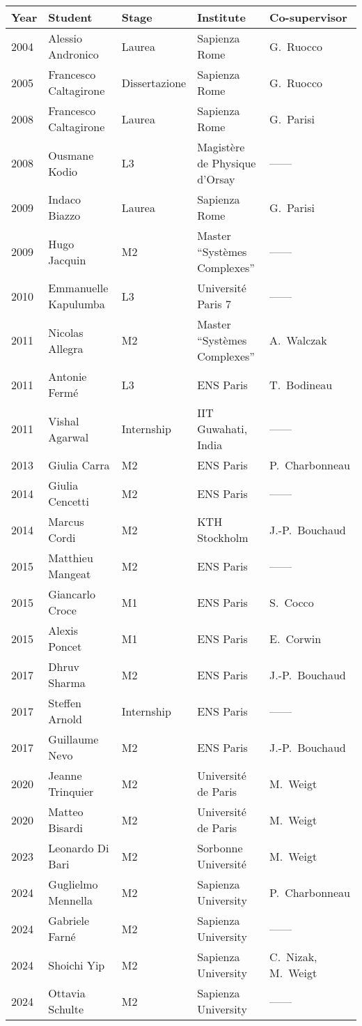 \documentclass[a4paper,10pt]{article}
\begin{document}
\begin{table}[h]
\begin{tabular}{lllll}
Year  & Student   & Stage   & Institute & Co-supervisor \\
\hline
2004 & Alessio Andronico & Laurea  & Sapienza Rome & G.~Ruocco \\
2005 & Francesco Caltagirone & Dissertazione  & Sapienza Rome&  G.~Ruocco \\
2008 & Francesco Caltagirone & Laurea  & Sapienza Rome&  G.~Parisi \\
2008 & Ousmane Kodio  & L3   & Magist\`ere de Physique d'Orsay  & ------ \\
2009 & Indaco Biazzo     & Laurea  & Sapienza Rome  & G.~Parisi \\
2009 & Hugo Jacquin   & M2   & Master ``Syst\`emes Complexes'' & ------ \\
2010 & Emmanuelle Kapulumba & L3  & Universit\'e Paris 7  & ------ \\
2011 & Nicolas Allegra   & M2 & Master ``Syst\`emes Complexes'' & A.~Walczak \\
2011 & Antonie Ferm\'e  & L3 & ENS Paris & T.~Bodineau \\
2011 & Vishal Agarwal &  Internship & IIT Guwahati, India & ------ \\
2013 & Giulia Carra    & M2   & ENS Paris   & P.~Charbonneau \\
2014 & Giulia Cencetti & M2  & ENS Paris   & ------ \\
2014 & Marcus Cordi   & M2  & KTH Stockholm  & J.-P.~Bouchaud \\
2015 & Matthieu Mangeat & M2  & ENS Paris   & ------ \\
2015 & Giancarlo Croce   & M1 & ENS Paris  & S.~Cocco \\
2015 & Alexis Poncet     & M1  & ENS Paris   & E.~Corwin \\
2017 & Dhruv Sharma & M2  & ENS Paris & J.-P.~Bouchaud \\
2017 & Steffen Arnold  & Internship & ENS Paris & ------ \\
2017 & Guillaume Nevo & M2 & ENS Paris & J.-P.~Bouchaud \\
2020 & Jeanne Trinquier & M2 & Universit\'e de Paris & M.~Weigt \\
2020 & Matteo Bisardi & M2 & Universit\'e de Paris & M.~Weigt \\
2023 & Leonardo Di Bari & M2 & Sorbonne Universit\'e & M.~Weigt\\
2024 & Guglielmo Mennella & M2 & Sapienza University & P.~Charbonneau\\
2024 & Gabriele Farn\'e & M2 & Sapienza University & ------\\
2024 & Shoichi Yip & M2 & Sapienza University & C.~Nizak, M.~Weigt \\
2024 & Ottavia Schulte & M2 & Sapienza University & ------ \\
\end{tabular}
\end{table}
\end{document}

